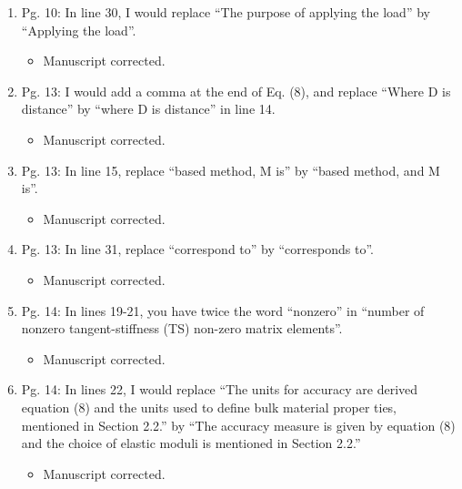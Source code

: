 \documentclass{article}
\begin{document}
\begin{enumerate}
\begin{enumerate}
 \item Pg. 10: In line 30, I would replace “The purpose of applying the load” by “Applying
the load”.

{\color{red}  
\begin{itemize}
     \item
 Manuscript corrected. 
  \end{itemize}}

 \item Pg. 13: I would add a comma at the end of Eq. (8), and replace “Where D is
distance” by “where D is distance” in line 14.

{\color{red}  
\begin{itemize}
     \item
 Manuscript corrected. 
  \end{itemize}}

 \item Pg. 13: In line 15, replace “based method, M is” by “based method, and M is”.

{\color{red}  
\begin{itemize}
     \item
 Manuscript corrected. 
  \end{itemize}}

 \item Pg. 13: In line 31, replace “correspond to” by “corresponds to”.

{\color{red}  
\begin{itemize}
     \item
 Manuscript corrected. 
  \end{itemize}}

 \item Pg. 14: In lines 19-21, you have twice the word “nonzero” in “number of nonzero
tangent-stiffness (TS) non-zero matrix elements”.

{\color{red}  
\begin{itemize}
     \item
 Manuscript corrected. 
  \end{itemize}}

 \item Pg. 14: In lines 22, I would replace “The units for accuracy are derived equation (8)
and the units used to deﬁne bulk material proper ties, mentioned in Section 2.2.” by
“The accuracy measure is given by equation (8) and the choice of elastic moduli is
mentioned in Section 2.2.”

{\color{red}  
\begin{itemize}
     \item
 Manuscript corrected. 
  \end{itemize}}


\end{enumerate}
\end{enumerate}
\end{document}
